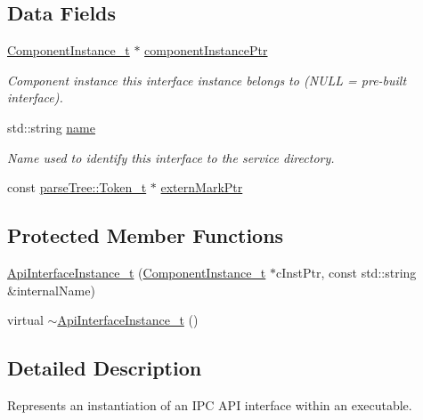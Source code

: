 \subsection*{Data Fields}
\begin{DoxyCompactItemize}
\item 
\hyperlink{structmodel_1_1_component_instance__t}{Component\+Instance\+\_\+t} $\ast$ \hyperlink{structmodel_1_1_api_interface_instance__t_a4c37d0ba0da80e384c087035aedba709}{component\+Instance\+Ptr}
\begin{DoxyCompactList}\small\item\em Component instance this interface instance belongs to (N\+U\+LL = pre-\/built interface). \end{DoxyCompactList}\item 
std\+::string \hyperlink{structmodel_1_1_api_interface_instance__t_a026897fdfeabd20dd30bf19ba12a5e8b}{name}
\begin{DoxyCompactList}\small\item\em Name used to identify this interface to the service directory. \end{DoxyCompactList}\item 
const \hyperlink{structparse_tree_1_1_token__t}{parse\+Tree\+::\+Token\+\_\+t} $\ast$ \hyperlink{structmodel_1_1_api_interface_instance__t_ac7ee7a5b626887e5738b861a98850064}{extern\+Mark\+Ptr}
\end{DoxyCompactItemize}
\subsection*{Protected Member Functions}
\begin{DoxyCompactItemize}
\item 
\hyperlink{structmodel_1_1_api_interface_instance__t_a1aa9dbc0c15682eef259f4007ea79cb6}{Api\+Interface\+Instance\+\_\+t} (\hyperlink{structmodel_1_1_component_instance__t}{Component\+Instance\+\_\+t} $\ast$c\+Inst\+Ptr, const std\+::string \&internal\+Name)
\item 
virtual \hyperlink{structmodel_1_1_api_interface_instance__t_a4b46967dab99d401adce1b0635b0bfbf}{$\sim$\+Api\+Interface\+Instance\+\_\+t} ()
\end{DoxyCompactItemize}


\subsection{Detailed Description}
Represents an instantiation of an I\+PC A\+PI interface within an executable.

